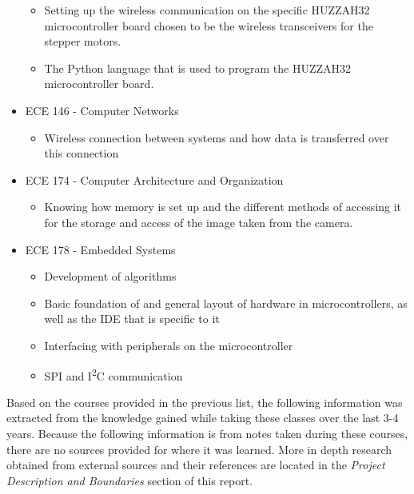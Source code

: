 \begin{itemize}
	\begin{itemize}
		\item Setting up the wireless communication on the specific HUZZAH32 microcontroller board chosen to be the wireless transceivers for the stepper motors.
		\item The Python language that is used to program the HUZZAH32 microcontroller board.
	\end{itemize}
\item ECE 146 - Computer Networks
	\begin{itemize}
		\item Wireless connection between systems and how data is transferred over this connection
	\end{itemize}
\item ECE 174 - Computer Architecture and Organization
	\begin{itemize}
		\item Knowing how memory is set up and the different methods of accessing it for the storage and access of the image taken from the camera.
	\end{itemize}
\item ECE 178 - Embedded Systems
	\begin{itemize}
		\item Development of algorithms
		\item Basic foundation of and general layout of hardware in microcontrollers, as well as the IDE that is specific to it
		\item Interfacing with peripherals on the microcontroller
		\item SPI and I\textsuperscript{2}C communication
	\end{itemize}
\end{itemize}\par
 
Based on the courses provided in the previous list, the following information was extracted from the knowledge gained while taking these classes over the last 3-4 years. Because the following information is from notes taken during these courses, there are no sources provided for where it was learned. More in depth research obtained from external sources and their references are located in the \textit{Project Description and Boundaries} section of this report.\\

